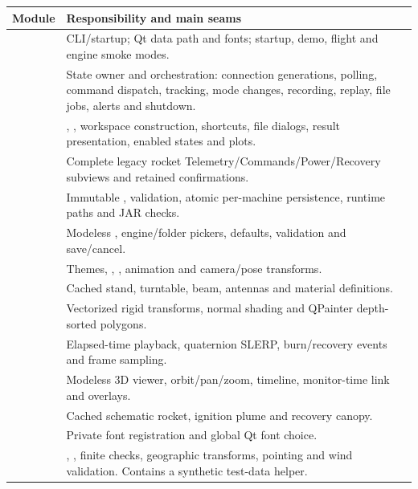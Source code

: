 \begin{longtable}{@{}L{.29\linewidth}L{.64\linewidth}@{}}
\toprule Module & Responsibility and main seams \\\midrule\endhead
{} & CLI/startup; Qt data path and fonts; startup, demo, flight and engine smoke modes. \\
 & State owner and orchestration: connection generations, polling, command dispatch, tracking, mode changes, recording, replay, file jobs, alerts and shutdown. \\
 & , , workspace construction, shortcuts, file dialogs, result presentation, enabled states and plots. \\
 & Complete legacy rocket Telemetry/Commands/Power/Recovery subviews and retained confirmations. \\
 & Immutable , validation, atomic per-machine persistence, runtime paths and JAR checks. \\
 & Modeless , engine/folder pickers, defaults, validation and save/cancel. \\
 & Themes, , , animation and camera/pose transforms. \\
 & Cached stand, turntable, beam, antennas and material definitions. \\
 & Vectorized rigid transforms, normal shading and QPainter depth-sorted polygons. \\
 & Elapsed-time playback, quaternion SLERP, burn/recovery events and frame sampling. \\
 & Modeless 3D viewer, orbit/pan/zoom, timeline, monitor-time link and overlays. \\
 & Cached schematic rocket, ignition plume and recovery canopy. \\
 & Private font registration and global Qt font choice. \\
 & , , finite checks, geographic transforms, pointing and wind validation. Contains a synthetic test-data helper. \\

\end{longtable}
